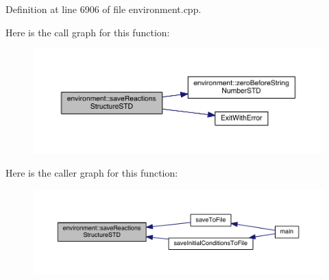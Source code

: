 Definition at line 6906 of file environment.\-cpp.



Here is the call graph for this function\-:
\nopagebreak
\begin{figure}[H]
\begin{center}
\leavevmode
\includegraphics[width=350pt]{a00014_ad381c4ce24045d504539bb7c74800739_cgraph}
\end{center}
\end{figure}




Here is the caller graph for this function\-:
\nopagebreak
\begin{figure}[H]
\begin{center}
\leavevmode
\includegraphics[width=350pt]{a00014_ad381c4ce24045d504539bb7c74800739_icgraph}
\end{center}
\end{figure}


